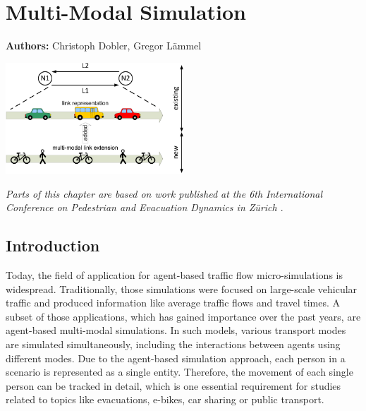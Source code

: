\chapter{Multi-Modal Simulation}
\label{ch:multimodalsim}

\hfill \textbf{Authors:} Christoph Dobler, Gregor Lämmel

\begin{center} \includegraphics[width=0.5\textwidth, angle=0]{extending/figures/MultiModalSimulation/multi-modal-link-extension} \end{center}



\textit{Parts of this chapter are based on work published at the 6th International Conference on Pedestrian and Evacuation Dynamics in Zürich  \citep{DoblerLaemmel_PED_2012}}.


\section{Introduction}
Today, the field of application for agent-based traffic flow micro-simulations is widespread. Traditionally, those simulations were focused on large-scale vehicular traffic and produced information like average traffic flows and travel times. A subset of those applications, which has gained importance over the past years, are agent-based multi-modal simulations. In such models, various transport modes are simulated simultaneously, including the interactions between agents using different modes. Due to the agent-based simulation approach, each person in a scenario is represented as a single entity. Therefore, the movement of each single person can be tracked in detail, which is one essential requirement for studies related to topics like evacuations, e-bikes, car sharing or public transport.

